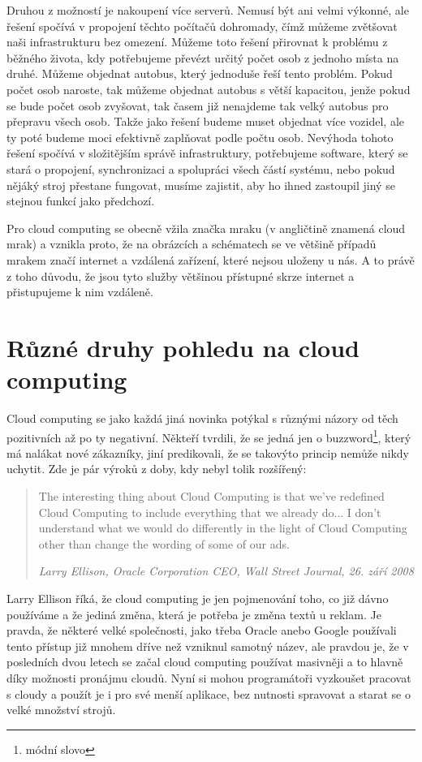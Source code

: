 Druhou z možností je nakoupení více serverů. Nemusí být ani velmi výkonné, ale řešení spočívá v propojení těchto počítačů dohromady, čímž můžeme zvětšovat naši infrastrukturu bez omezení. Můžeme toto řešení přirovnat k problému z běžného života, kdy potřebujeme převézt určitý počet osob z jednoho místa na druhé. Můžeme objednat autobus, který jednoduše řeší tento problém. Pokud počet osob naroste, tak můžeme objednat autobus s větší kapacitou, jenže pokud se bude počet osob zvyšovat, tak časem již nenajdeme tak velký autobus pro přepravu všech osob. Takže jako řešení budeme muset objednat více vozidel, ale ty poté budeme moci efektivně zaplňovat podle počtu osob. Nevýhoda tohoto řešení spočívá v složitějším správě infrastruktury, potřebujeme software, který se stará o propojení, synchronizaci a spolupráci všech částí systému, nebo pokud nějáký stroj přestane fungovat, musíme zajistit, aby ho ihned zastoupil jiný se stejnou funkcí jako předchozí.

Pro cloud computing se obecně vžila značka mraku (v angličtině znamená cloud mrak) a vznikla proto, že na obrázcích a schématech se ve většině případů mrakem značí internet a vzdálená zařízení, které nejsou uloženy u nás. A to právě z toho důvodu, že jsou tyto služby většinou přístupné skrze internet a přistupujeme k nim vzdáleně.

\section{Různé druhy pohledu na cloud computing}
Cloud computing se jako každá jiná novinka potýkal s různými názory od těch pozitivních až po ty negativní. Někteří tvrdili, že se jedná jen o buzzword\footnote{módní slovo}, který má nalákat nové zákazníky, jiní predikovali, že se takovýto princip nemůže nikdy uchytit. Zde je pár výroků  z doby, kdy nebyl tolik rozšířený:

\begin{quotation}
The interesting thing about Cloud Computing is that we’ve redefined Cloud Computing to include everything that we already do...  I don’t understand what we would do differently in the light of Cloud Computing other than change the wording of some of our ads.

\em Larry Ellison, Oracle Corporation CEO, Wall Street Journal, 26. září 2008
\end{quotation}

Larry Ellison říká, že cloud computing je jen pojmenování toho, co již dávno používáme a že jediná změna, která je potřeba je změna textů u reklam. Je pravda, že některé velké společnosti, jako třeba Oracle anebo Google používali tento přístup již mnohem dříve než vzniknul samotný název, ale pravdou je, že v posledních dvou letech se začal cloud computing používat masivněji a to hlavně díky možnosti pronájmu cloudů. Nyní si mohou programátoři vyzkoušet pracovat s cloudy a použít je i pro své menší aplikace, bez nutnosti spravovat a starat se o velké množství strojů.

